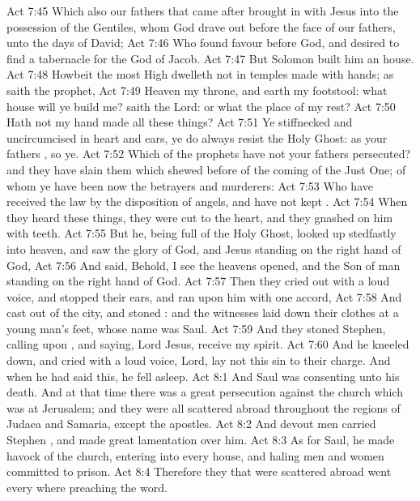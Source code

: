 \vs Act 7:45 Which also our fathers that came after brought in with Jesus into the possession of the Gentiles, whom God drave out before the face of our fathers, unto the days of David;
\vs Act 7:46 Who found favour before God, and desired to find a tabernacle for the God of Jacob.
\vs Act 7:47 But Solomon built him an house.
\vs Act 7:48 Howbeit the most High dwelleth not in temples made with hands; as saith the prophet,
\vs Act 7:49 Heaven  my throne, and earth  my footstool: what house will ye build me? saith the Lord: or what  the place of my rest?
\vs Act 7:50 Hath not my hand made all these things?
\vs Act 7:51 Ye stiffnecked and uncircumcised in heart and ears, ye do always resist the Holy Ghost: as your fathers , so  ye.
\vs Act 7:52 Which of the prophets have not your fathers persecuted? and they have slain them which shewed before of the coming of the Just One; of whom ye have been now the betrayers and murderers:
\vs Act 7:53 Who have received the law by the disposition of angels, and have not kept .
\vs Act 7:54 When they heard these things, they were cut to the heart, and they gnashed on him with  teeth.
\vs Act 7:55 But he, being full of the Holy Ghost, looked up stedfastly into heaven, and saw the glory of God, and Jesus standing on the right hand of God,
\vs Act 7:56 And said, Behold, I see the heavens opened, and the Son of man standing on the right hand of God.
\vs Act 7:57 Then they cried out with a loud voice, and stopped their ears, and ran upon him with one accord,
\vs Act 7:58 And cast  out of the city, and stoned : and the witnesses laid down their clothes at a young man's feet, whose name was Saul.
\vs Act 7:59 And they stoned Stephen, calling upon , and saying, Lord Jesus, receive my spirit.
\vs Act 7:60 And he kneeled down, and cried with a loud voice, Lord, lay not this sin to their charge. And when he had said this, he fell asleep.
\vs Act 8:1 And Saul was consenting unto his death. And at that time there was a great persecution against the church which was at Jerusalem; and they were all scattered abroad throughout the regions of Judaea and Samaria, except the apostles.
\vs Act 8:2 And devout men carried Stephen , and made great lamentation over him.
\vs Act 8:3 As for Saul, he made havock of the church, entering into every house, and haling men and women committed  to prison.
\vs Act 8:4 Therefore they that were scattered abroad went every where preaching the word.
